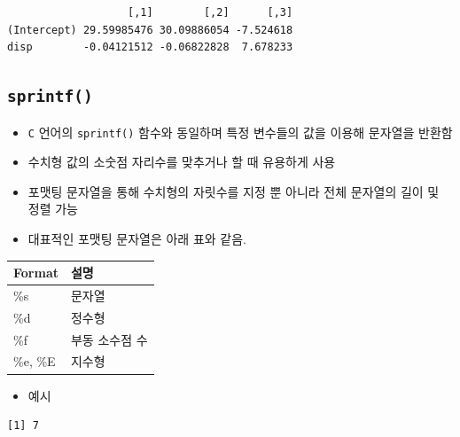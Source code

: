 \documentclass[
  11pt,
]{krantz}
\newenvironment{Shaded}{\begin{snugshade}}{\end{snugshade}}
\newcommand{\CommentTok}[1]{\textcolor[rgb]{0.37,0.37,0.37}{\textit{#1}}}
\newcommand{\FunctionTok}[1]{\textcolor[rgb]{0,0,0}{#1}}
\newcommand{\NormalTok}[1]{#1}
\newcommand{\SpecialCharTok}[1]{\textcolor[rgb]{0,0,0}{#1}}
\providecommand{\tightlist}{%
  \setlength{\itemsep}{0pt}\setlength{\parskip}{0pt}}
\begin{document}
\begin{verbatim}
                   [,1]        [,2]      [,3]
(Intercept) 29.59985476 30.09886054 -7.524618
disp        -0.04121512 -0.06822828  7.678233
\end{verbatim}

\normalsize

\hypertarget{sprintf}{%
\subsection{\texorpdfstring{\textbf{\texttt{sprintf()}}}{sprintf()}}\label{sprintf}}

\begin{itemize}
\tightlist
\item
  \texttt{C} 언어의 \texttt{sprintf()} 함수와 동일하며 특정 변수들의 값을 이용해 문자열을 반환함
\item
  수치형 값의 소숫점 자리수를 맞추거나 할 때 유용하게 사용
\item
  포맷팅 문자열을 통해 수치형의 자릿수를 지정 뿐 아니라 전체 문자열의 길이 및 정렬 가능
\item
  대표적인 포맷팅 문자열은 아래 표와 같음.
\end{itemize}

\footnotesize

\begin{tabular}{l|l}
\hline
Format & 설명\\
\hline
\%s & 문자열\\
\hline
\%d & 정수형\\
\hline
\%f & 부동 소수점 수\\
\hline
\%e, \%E & 지수형\\
\hline
\end{tabular}

\normalsize

\begin{itemize}
\tightlist
\item
  예시
\end{itemize}

\footnotesize

\begin{Shaded}
\end{Shaded}

\begin{verbatim}
[1] 7
\end{verbatim}
\end{document}
